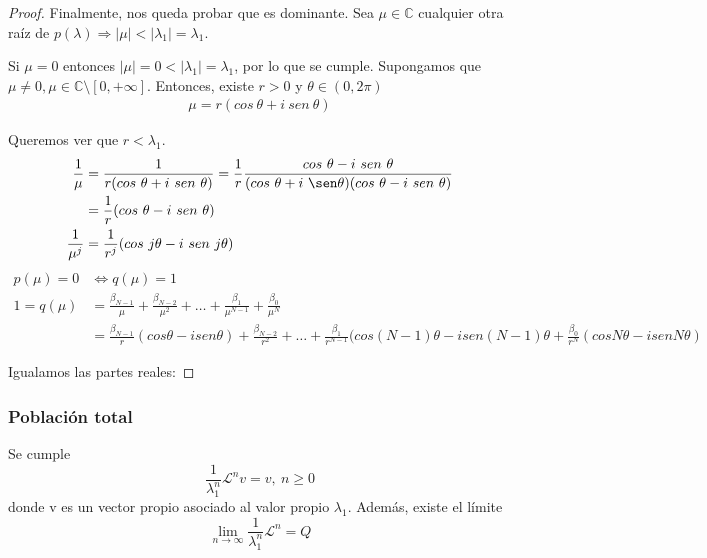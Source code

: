 \begin{proof}
        Finalmente, nos queda probar que es dominante. Sea $\mu \in \mathbb C$ cualquier otra raíz de $p(\lambda) \Rightarrow |\mu| < |\lambda_1| = \lambda_1$.

        Si $\mu = 0$ entonces $|\mu| = 0 < |\lambda_1| = \lambda_1$, por lo que se cumple. Supongamos que $\mu \neq 0, \mu \in \mathbb C \setminus [0, +\infty]$. Entonces, existe $r > 0$ y $\theta \in (0, 2\pi)$
        \begin{align*}
            \label{}
            \mu = r(cos \ \theta + i \ sen \ \theta)
        \end{align*}

        Queremos ver que $ r < \lambda_1$.
        \begin{align*}
            \label{}
            \frac{1}{\mu} &= \frac{1}{r(cos \ \theta + i \ sen \ \theta)} = \frac{1}{r}\frac{cos \ \theta - i \ sen \ \theta}{(cos \ \theta + i \ \sen \theta)(cos \ \theta - i \ sen \ \theta)} \\
                          &= \frac{1}{r}(cos \ \theta - i \ sen \ \theta) \\
            \frac{1}{\mu^j} &=  \frac{1}{r^j}(cos \ j\theta - i \ sen \ j\theta)
        \end{align*}
        \begin{align*}
            \label{eq:}
            p(\mu) = 0 &\iff q(\mu) = 1\\
            1 = q(\mu) &= \frac{\beta_{N-1}}{\mu} + \frac{\beta_{N-2}}{\mu^2} + \hdots + \frac{\beta_{1}}{\mu^{N-1}} + \frac{\beta_{0}}{\mu^N} \\
                       &= \frac{\beta_{N-1}}{r}(cos\theta - isen\theta) + \frac{\beta_{N-2}}{r^2}+\hdots+\frac{\beta_1}{r^{N-1}}(cos(N-1)\theta - isen(N-1)\theta+\frac{\beta_0}{r^N}(cosN\theta -isenN\theta)
        \end{align*}

	Igualamos las partes reales:

     \end{proof}


     \subsubsection{Población total}
     \label{ssub:poblaci_n_total}

     Se cumple $$\frac{1}{\lambda_1^n}\mathcal L^n v = v, \ n \geq 0$$ donde v es un vector propio asociado al valor propio $\lambda_1$. Además, existe el límite $$\lim_{n \to \infty} \frac{1}{\lambda_1^n} \mathcal L^n = Q$$

